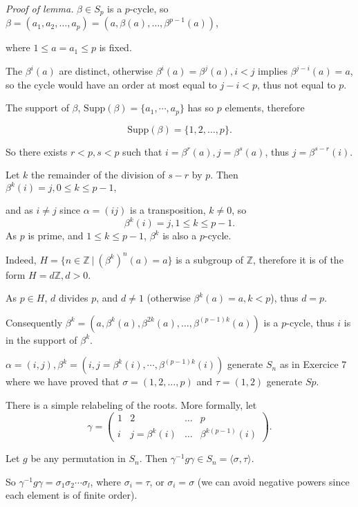 \documentclass[11pt,a4paper]{article}
\begin{document}
{\it Proof of lemma.}  $\beta \in S_p$ is a $p$-cycle, so $\beta = (a_1,a_2,\ldots,a_p) = (a , \beta(a), \ldots, \beta^{p-1}(a))$, 

where $1 \leq a=a_1\leq p$ is fixed.

The $\beta^i(a)$ are distinct, otherwise $\beta^i(a) = \beta^j(a), i<j$ implies  $ \beta^{j-i}(a) = a$, so the cycle would have an order at most equal to $j-i <p$, thus not equal to $p$.

The support of $\beta$, $\mathrm{Supp}(\beta) = \{a_1,\cdots,a_p\}$ has so $p$ elements, therefore 

$$\mathrm{Supp}(\beta) =\{1,2,\ldots,p\}.$$

So there exists $r<p, s<p$ such that $i = \beta^r(a), j = \beta^s(a)$, thus $j = \beta^{s-r}(i)$.

Let $k$ the remainder of the division of $s-r$ by $p$. Then $\beta^k(i) = j, 0 \leq k \leq p-1,$

and as $i\neq j$ since $\alpha = (i j)$ is a transposition, $k\neq 0$, so
$$\beta^k(i) = j, 1 \leq k \leq p-1.$$
As $p$ is prime, and $1 \leq k \leq p-1$, $\beta^k$ is also a $p$-cycle.

 Indeed,  $H = \{n \in \mathbb{Z} \ \vert  \ (\beta^k)^n(a) = a\}$ is a subgroup of $\mathbb{Z}$, therefore it is of the form $H=d\mathbb{Z}, d>0$.

As $p \in H$, $d$ divides $p$, and $d \neq 1$ (otherwise $\beta^k(a) = a, k<p $), thus $d = p$.

Consequently $\beta^k = (a, \beta^k(a), \beta^{2k}(a), \ldots,\beta^{(p-1)k}(a))$ is a $p$-cycle, thus $i$ is in the support of $\beta^k$.

$\alpha= (i,j), \beta^k = (i , j = \beta^k(i), \cdots,\beta^{(p-1)k}(i) )$ generate  $S_n$ as in Exercice 7 where we have proved that $\sigma = (1,2,\ldots,p)$ and $\tau = (1,2)$ generate $Sp$.

 There is a simple relabeling of the roots. More formally, let 
 $$\gamma =
\left(
\begin{array}{cccc}
  1 & 2  & \ldots & p \\
   i &  j = \beta^k(i) & \ldots & \beta^{k(p-1)}(i) 
\end{array}
\right).
$$

Let $g $ be any permutation in $S_n$. Then $\gamma^{-1} g \gamma \in S_n = \langle \sigma, \tau \rangle$. 

So  $\gamma^{-1} g \gamma = \sigma_1 \sigma_2 \cdots \sigma_l$, where $\sigma_i = \tau$, or $\sigma_i =\sigma$ (we can avoid negative powers since each element is of finite order).
\end{document}
